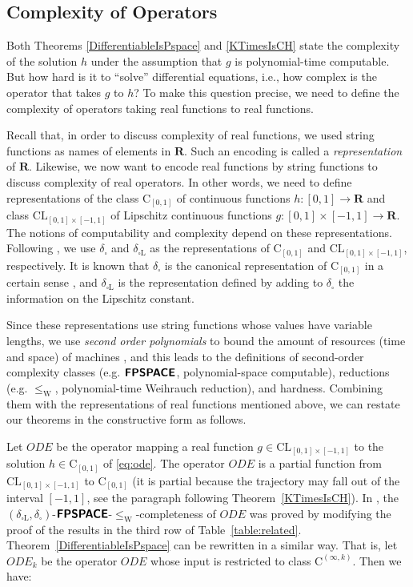 \documentclass[12pt,a4paper]{article}
\theoremstyle{definition}
\theoremstyle{remark}
\newcommand{\R}{\mathbf R}
\newcommand{\OpIVP}{\mathit{ODE}}
\newcommand{\deltabox}{\delta _\square}
\newcommand{\deltaboxLip}{\delta _{\square \mathrm L}}
\newcommand{\classtwofont}[1]{\text{\bfseries \sffamily \upshape #1}}
\newcommand{\classFPSPACEtwo}{\classtwofont{FPSPACE}}
\newcommand{\redW}{\leq _{\mathrm W}}
\newcommand{\classLip}{\mathrm{CL}}
\newcommand{\classC}{\mathrm C}
\begin{document}
\subsection{Complexity of Operators}
\label{section: constructive}

Both Theorems \ref{DifferentiableIsPspace} and \ref{KTimesIsCH}
state the complexity of the solution $h$ under the assumption 
that $g$ is polynomial-time computable.
But how hard is it to ``solve'' differential equations,
i.e., how complex is the operator that takes $g$ to $h$? 
To make this question precise,
we need to define the complexity of operators 
taking real functions to real functions.

Recall that, in order to discuss complexity of real functions,
we used string functions as names of elements in $\R$. 
Such an encoding is called a \emph{representation} of $\R$.
Likewise, 
we now want to encode real functions by string functions
to discuss complexity of real operators. 
In other words, we need to define representations of
the class $\classC _{[0, 1]}$ of continuous functions $h \colon [0,1] \to \R$ 
and class $\classLip _{[0, 1] \times [-1, 1]}$ of Lipschitz continuous functions $g \colon [0, 1] \times [-1, 1] \to \R$. 
The notions of computability and complexity depend on these representations.
Following \cite{kawamura2010operators},
we use $\deltabox$ and $\deltaboxLip$ as the 
representations of $\classC_{[0,1]}$ and $\classLip_{[0, 1] \times [-1, 1]}$, 
respectively.
It is known that 
$\deltabox$ is the canonical representation of $\classC_{[0, 1]}$ 
in a certain sense \cite{kawamura11:_funct_space_repres_and_polyn_time_comput}, 
and $\deltaboxLip$ is the representation defined by adding to $\deltabox$
the information on the Lipschitz constant.

Since these representations use string functions 
whose values have variable lengths,
we use \emph{second order polynomials}
to bound the amount of resources (time and space) of machines
\cite{kawamura2010operators}, 
and this leads to the definitions of second-order complexity classes
(e.g. $\classFPSPACEtwo$, polynomial-space computable),
reductions (e.g. $\redW$, polynomial-time Weihrauch reduction), 
and hardness.
Combining them with the representations of real functions mentioned above,
we can restate our theorems in the constructive form as follows.

Let $\OpIVP$ be the operator 
mapping a real function $g \in \classLip_{[0, 1] \times [-1, 1]}$ to
the solution $h \in \classC_{[0, 1]}$ of \eqref{eq:ode}.
The operator $\OpIVP$ is a partial function 
from $\classLip _{[0, 1] \times [-1, 1]}$ to $\classC _{[0, 1]}$
(it is partial because the trajectory may fall out of the interval $[-1, 1]$, 
see the paragraph following Theorem~\ref{KTimesIsCH}).
In \cite[Theorem 4.9]{kawamura2010operators}, the
$(\deltaboxLip, \deltabox)$-$\classFPSPACEtwo$-$\redW$-completeness of $\OpIVP$ 
was proved
by modifying
the proof of the results in the third row of Table~\ref{table:related}.
Theorem~\ref{DifferentiableIsPspace} can be rewritten in a similar way. 
That is, let $\OpIVP _k$ be the operator $\OpIVP$ whose input is restricted to class $\classC^{(\infty, k)}$. Then we have: 
\end{document}
